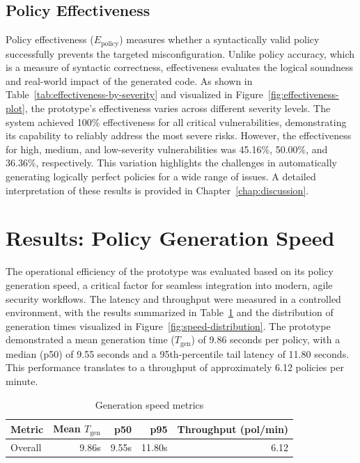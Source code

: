 \subsection{Policy Effectiveness}
Policy effectiveness ($E_{\text{policy}}$) measures whether a syntactically valid policy successfully prevents the targeted misconfiguration. Unlike policy accuracy, which is a measure of syntactic correctness, effectiveness evaluates the logical soundness and real-world impact of the generated code. As shown in Table~\ref{tab:effectiveness-by-severity} and visualized in Figure~\ref{fig:effectiveness-plot}, the prototype's effectiveness varies across different severity levels. The system achieved 100\% effectiveness for all critical vulnerabilities, demonstrating its capability to reliably address the most severe risks. However, the effectiveness for high, medium, and low-severity vulnerabilities was 45.16\%, 50.00\%, and 36.36\%, respectively. This variation highlights the challenges in automatically generating logically perfect policies for a wide range of issues. A detailed interpretation of these results is provided in Chapter~\ref{chap:discussion}.

\section{Results: Policy Generation Speed}\label{sec:results-speed}

The operational efficiency of the prototype was evaluated based on its policy generation speed, a critical factor for seamless integration into modern, agile security workflows. The latency and throughput were measured in a controlled environment, with the results summarized in Table~\ref{tab:speed-metrics} and the distribution of generation times visualized in Figure~\ref{fig:speed-distribution}.
The prototype demonstrated a mean generation time ($T_{\text{gen}}$) of 9.86 seconds per policy, with a median (p50) of 9.55 seconds and a 95th-percentile tail latency of 11.80 seconds. This performance translates to a throughput of approximately 6.12 policies per minute.

\begin{table}[htbp]
	\centering
		\caption{Generation speed metrics}\label{tab:speed-metrics}
	\begin{tabular}{lrrrr}
		\hline
		Metric & Mean $T_{\text{gen}}$ & p50 & p95 & Throughput (pol/min) \\
		\hline
		Overall & 9.86s & 9.55s & 11.80s & 6.12 \\
		\hline
	\end{tabular}
\end{table}

